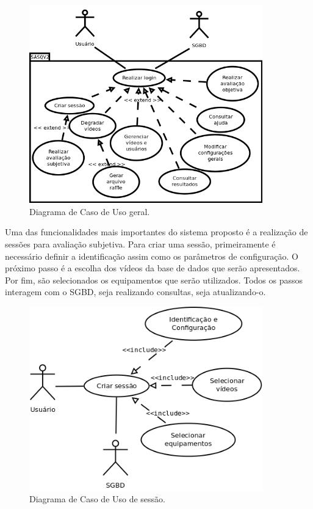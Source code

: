 \begin{figure}[!htb]
	\centering
	\includegraphics[width=0.9\textwidth]{./diagramas/casodeuso2.png}
	\caption{Diagrama de Caso de Uso geral.}
	\label{fig:ucdgeral}
\end{figure}

Uma das funcionalidades mais importantes do sistema proposto é a realização de sessões para avaliação subjetiva. Para criar uma sessão, primeiramente é necessário definir a identificação assim como os parâmetros de configuração. O próximo passo é a escolha dos vídeos da base de dados que serão apresentados. Por fim, são selecionados os equipamentos que serão utilizados. Todos os passos interagem com o SGBD, seja realizando consultas, seja atualizando-o.

\begin{figure}[!htb]
	\centering
	\includegraphics[width=0.9\textwidth]{./diagramas/sessao.png}
	\caption{Diagrama de Caso de Uso de sessão.}
	\label{fig:ucdsessao}
\end{figure}

